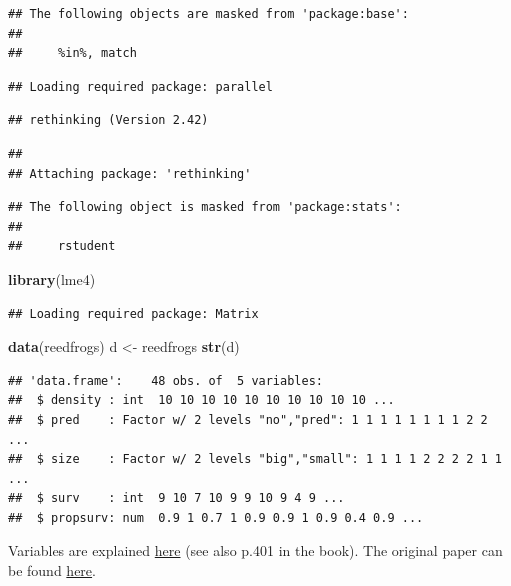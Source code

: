 \documentclass[
]{article}
\newenvironment{Shaded}{\begin{snugshade}}{\end{snugshade}}
\newcommand{\FunctionTok}[1]{\textcolor[rgb]{0.13,0.29,0.53}{\textbf{#1}}}
\newcommand{\NormalTok}[1]{#1}
\newcommand{\OtherTok}[1]{\textcolor[rgb]{0.56,0.35,0.01}{#1}}
\begin{document}
\begin{verbatim}
## The following objects are masked from 'package:base':
## 
##     %in%, match
\end{verbatim}

\begin{verbatim}
## Loading required package: parallel
\end{verbatim}

\begin{verbatim}
## rethinking (Version 2.42)
\end{verbatim}

\begin{verbatim}
## 
## Attaching package: 'rethinking'
\end{verbatim}

\begin{verbatim}
## The following object is masked from 'package:stats':
## 
##     rstudent
\end{verbatim}

\begin{Shaded}
\begin{Highlighting}[]
\FunctionTok{library}\NormalTok{(lme4)}
\end{Highlighting}
\end{Shaded}

\begin{verbatim}
## Loading required package: Matrix
\end{verbatim}

\begin{Shaded}
\begin{Highlighting}[]
\FunctionTok{data}\NormalTok{(reedfrogs)}
\NormalTok{d }\OtherTok{\textless{}{-}}\NormalTok{ reedfrogs}
\FunctionTok{str}\NormalTok{(d)}
\end{Highlighting}
\end{Shaded}

\begin{verbatim}
## 'data.frame':    48 obs. of  5 variables:
##  $ density : int  10 10 10 10 10 10 10 10 10 10 ...
##  $ pred    : Factor w/ 2 levels "no","pred": 1 1 1 1 1 1 1 1 2 2 ...
##  $ size    : Factor w/ 2 levels "big","small": 1 1 1 1 2 2 2 2 1 1 ...
##  $ surv    : int  9 10 7 10 9 9 10 9 4 9 ...
##  $ propsurv: num  0.9 1 0.7 1 0.9 0.9 1 0.9 0.4 0.9 ...
\end{verbatim}

Variables are explained
\href{https://www.rdocumentation.org/packages/rethinking/versions/2.13/topics/reedfrogs}{here}
(see also p.401 in the book). The original paper can be found
\href{https://link.springer.com/article/10.1007/s00442-004-1806-x}{here}.
\end{document}

